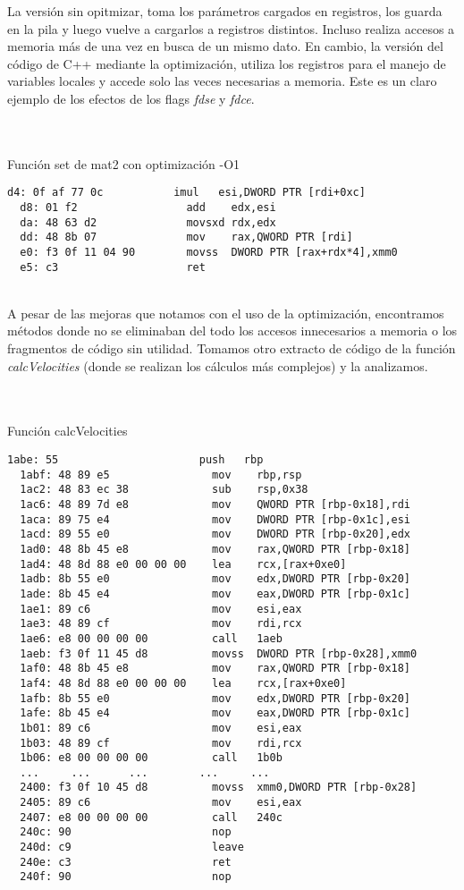 La versión sin opitmizar, toma los parámetros cargados en registros, los guarda en la pila y luego vuelve a cargarlos a registros distintos. Incluso realiza accesos a memoria más de una vez en busca de un mismo dato.
En cambio, la versión del código de C++ mediante la optimización, utiliza los registros para el manejo de variables locales y accede solo las veces necesarias a memoria. Este es un claro ejemplo de los efectos de los flags \textit{fdse} y \textit{fdce}.


~\\
~\\
{\center\large{Función set de mat2 con optimización -O1}}
\begin{lstlisting}[]
  d4: 0f af 77 0c           imul   esi,DWORD PTR [rdi+0xc]
  d8: 01 f2                 add    edx,esi
  da: 48 63 d2              movsxd rdx,edx
  dd: 48 8b 07              mov    rax,QWORD PTR [rdi]
  e0: f3 0f 11 04 90        movss  DWORD PTR [rax+rdx*4],xmm0
  e5: c3                    ret  
\end{lstlisting}




~\\

A pesar de las mejoras que notamos con el uso de la optimización, encontramos métodos donde no se eliminaban del todo los accesos innecesarios a memoria o los fragmentos de código sin utilidad. Tomamos otro extracto de código de la función \textit{calcVelocities} (donde se realizan los cálculos más complejos) y la analizamos. 

~\\
~\\
{\center\large{Función calcVelocities}}
\begin{lstlisting}[]
  1abe:	55                   	push   rbp
  1abf:	48 89 e5             	mov    rbp,rsp
  1ac2:	48 83 ec 38          	sub    rsp,0x38
  1ac6:	48 89 7d e8          	mov    QWORD PTR [rbp-0x18],rdi
  1aca:	89 75 e4             	mov    DWORD PTR [rbp-0x1c],esi
  1acd:	89 55 e0             	mov    DWORD PTR [rbp-0x20],edx
  1ad0:	48 8b 45 e8          	mov    rax,QWORD PTR [rbp-0x18]
  1ad4:	48 8d 88 e0 00 00 00 	lea    rcx,[rax+0xe0]
  1adb:	8b 55 e0             	mov    edx,DWORD PTR [rbp-0x20]
  1ade:	8b 45 e4             	mov    eax,DWORD PTR [rbp-0x1c]
  1ae1:	89 c6                	mov    esi,eax
  1ae3:	48 89 cf             	mov    rdi,rcx
  1ae6:	e8 00 00 00 00       	call   1aeb 
  1aeb:	f3 0f 11 45 d8       	movss  DWORD PTR [rbp-0x28],xmm0
  1af0:	48 8b 45 e8          	mov    rax,QWORD PTR [rbp-0x18]
  1af4:	48 8d 88 e0 00 00 00 	lea    rcx,[rax+0xe0]
  1afb:	8b 55 e0             	mov    edx,DWORD PTR [rbp-0x20]
  1afe:	8b 45 e4             	mov    eax,DWORD PTR [rbp-0x1c]
  1b01:	89 c6                	mov    esi,eax
  1b03:	48 89 cf             	mov    rdi,rcx
  1b06:	e8 00 00 00 00       	call   1b0b 
  ...     ...      ...        ...     ...
  2400:	f3 0f 10 45 d8       	movss  xmm0,DWORD PTR [rbp-0x28]
  2405:	89 c6                	mov    esi,eax
  2407:	e8 00 00 00 00       	call   240c 
  240c:	90                   	nop
  240d:	c9                   	leave  
  240e:	c3                   	ret    
  240f:	90                   	nop
\end{lstlisting}

